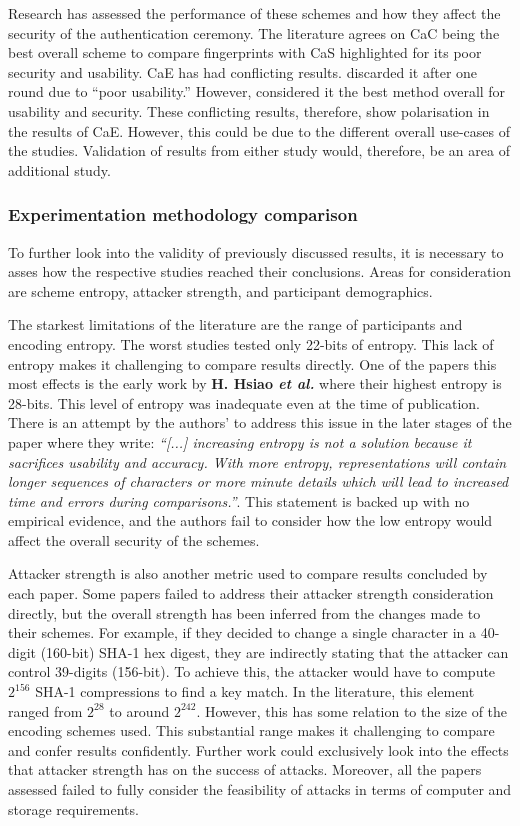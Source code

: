 Research has assessed the performance of these schemes and how they affect the security of the authentication ceremony. The literature agrees on CaC being the best overall scheme to compare fingerprints \cite{tan2017can}\cite{uzun2007usability} with CaS highlighted for its poor security and usability. CaE has had conflicting results. \cite{uzun2007usability} discarded it after one round due to ``poor usability.'' However, \cite{tan2017can} considered it the best method overall for usability and security. These conflicting results, therefore, show polarisation in the results of CaE. However, this could be due to the different overall use-cases of the studies. Validation of results from either study would, therefore, be an area of additional study.

\subsubsection*{Experimentation methodology comparison}
To further look into the validity of previously discussed results, it is necessary to asses how the respective studies reached their conclusions. Areas for consideration are scheme entropy, attacker strength, and participant demographics.

The starkest limitations of the literature are the range of participants and encoding entropy. The worst studies tested only 22-bits of entropy. This lack of entropy makes it challenging to compare results directly. One of the papers this most effects is the early work by \textbf{H. Hsiao \textit{et al.}}\cite{hsiao2009study}  where their highest entropy is 28-bits. This level of entropy was inadequate even at the time of publication. There is an attempt by the authors' to address this issue in the later stages of the paper where they write: \textit{``[...] increasing entropy is not a solution because it sacrifices usability and accuracy. With more entropy, representations will contain longer sequences of characters or more minute details which will lead to increased time and errors during comparisons.''}. This statement is backed up with no empirical evidence, and the authors fail to consider how the low entropy would affect the overall security of the schemes.

Attacker strength is also another metric used to compare results concluded by each paper. Some papers failed to address their attacker strength consideration directly, but the overall strength has been inferred from the changes made to their schemes. For example, if they decided to change a single character in a 40-digit (160-bit) SHA-1 hex digest, they are indirectly stating that the attacker can control 39-digits (156-bit). To achieve this, the attacker would have to compute $2^{156}$ SHA-1 compressions to find a key match.
In the literature, this element ranged from $2^{28}$ to around $2^{242}$. However, this has some relation to the size of the encoding schemes used. This substantial range makes it challenging to compare and confer results confidently. 
Further work could exclusively look into the effects that attacker strength has on the success of attacks. Moreover, all the papers assessed failed to fully consider the feasibility of attacks in terms of computer and storage requirements. 

